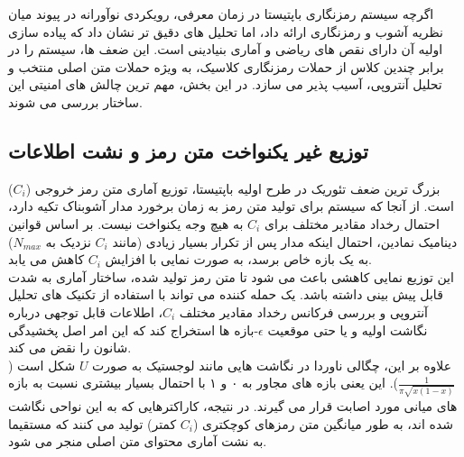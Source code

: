 \documentclass[12pt]{report}
\begin{document}
اگرچه سیستم رمزنگاری باپتیستا در زمان معرفی، رویکردی نوآورانه در پیوند میان نظریه آشوب و 
رمزنگاری ارائه داد، اما تحلیل های دقیق تر نشان داد که پیاده سازی اولیه آن دارای نقص های ریاضی 
و آماری بنیادینی است. این ضعف ها، سیستم را در برابر چندین کلاس از حملات رمزنگاری کلاسیک، 
به ویژه حملات متن اصلی منتخب و تحلیل آنتروپی، 
آسیب پذیر می سازد. در این بخش، مهم ترین چالش های امنیتی این ساختار بررسی می شوند.

\subsection[توزیع غیر یکنواخت متن رمز و نشت اطلاعات]{توزیع غیر یکنواخت متن رمز و نشت اطلاعات}
بزرگ ترین ضعف تئوریک در طرح اولیه باپتیستا، توزیع آماری متن رمز خروجی ($C_i$) است. از آنجا 
که سیستم برای تولید متن رمز به زمان برخورد مدار آشوبناک 
تکیه دارد، احتمال رخداد مقادیر مختلف برای $C_i$ به هیچ وجه یکنواخت 
نیست. بر اساس قوانین دینامیک نمادین، احتمال اینکه مدار پس 
از تکرار بسیار زیادی (مانند $C_i$ نزدیک به $N_{max}$) به یک بازه خاص برسد، به صورت نمایی با 
افزایش $C_i$ کاهش می یابد.
\\\noindent
این توزیع نمایی کاهشی باعث می شود تا متن رمز تولید شده، ساختار آماری به شدت قابل پیش بینی 
داشته باشد. یک حمله کننده می تواند با استفاده از تکنیک های 
تحلیل آنتروپی و بررسی فرکانس رخداد مقادیر مختلف $C_i$، اطلاعات قابل توجهی درباره نگاشت اولیه 
و یا حتی موقعیت $\epsilon$-بازه ها استخراج کند که این امر اصل پخشیدگی 
شانون را نقض می کند.
\\\noindent
علاوه بر این، چگالی ناوردا در نگاشت هایی مانند لوجستیک به 
صورت $U$ شکل است ($\frac{1}{\pi \sqrt{x(1-x)}}$). این یعنی بازه های مجاور به ۰ و ۱ با احتمال 
بسیار بیشتری نسبت به بازه های میانی مورد اصابت قرار می گیرند. در نتیجه، کاراکترهایی که به این 
نواحی نگاشت شده اند، به طور میانگین متن رمزهای کوچکتری ($C_i$ کمتر) تولید می کنند که مستقیما 
به نشت آماری محتوای متن اصلی منجر می شود.
\end{document}

